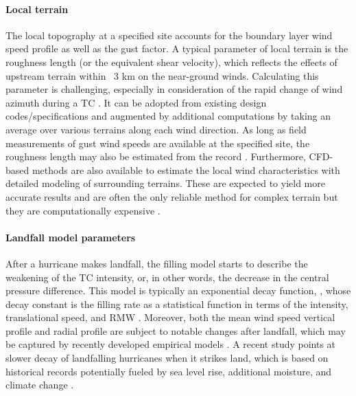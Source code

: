 \paragraph{Local terrain} The local topography at a specified site accounts for the boundary layer wind speed profile as well as the gust factor. A typical parameter of local terrain is the roughness length (or the equivalent shear velocity), which reflects the effects of upstream terrain within ~3 km on the near-ground winds. Calculating this parameter is challenging, especially in consideration of the rapid change of wind azimuth during a TC \citep{vickery2009hurricane-a}. It can be adopted from existing design codes/specifications and augmented by additional computations by taking an average over various terrains along each wind direction. As long as field measurements of gust wind speeds are available at the specified site, the roughness length may also be estimated from the record \citep{masters2010objective}. Furthermore, CFD-based methods are also available to estimate the local wind characteristics with detailed modeling of surrounding terrains. These are expected to yield more accurate results and are often the only reliable method for complex terrain but they are computationally expensive \citep{huang2013prediction, ishihara2005wind}. 

\paragraph{Landfall model parameters} After a hurricane makes landfall, the filling model starts to describe the weakening of the TC intensity, or, in other words, the decrease in the central pressure difference. This model is typically an exponential decay function, \citep{kaplan1995asimple, kaplan2001onthedecay}, whose decay constant is the filling rate as a statistical function in terms of the intensity, translational speed, and RMW \citep{vickery1995windfield, vickery2005simple, vickery2009hurricane-b}. Moreover, both the mean wind speed vertical profile and radial profile are subject to notable changes after landfall, which may be captured by recently developed empirical models \citep{fang2018reconstruction, snaiki2018semiempirical, zhao2013radial}. A recent study points at slower decay of landfalling hurricanes when it strikes land, which is based on historical records potentially fueled by sea level rise, additional moisture, and climate change \citep{li2020slower}. 

